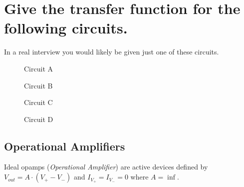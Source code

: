 \documentclass[main.tex]{subfiles}
\begin{document}
\section{Give the transfer function for the following circuits.}

\noindent In a real interview you would likely be given just one of these circuits.

\begin{figure}[h!]
    \begin{center}
        \begin{circuitikz}[american]
            \label{fig:unity_amp}
        \end{circuitikz}
        \caption{Circuit A}
    \end{center}
\end{figure}

\begin{figure}[h!]
    \begin{center}
        \begin{circuitikz}[american]
            \label{fig:inverting_amp}
        \end{circuitikz}
        \caption{Circuit B}
    \end{center}
\end{figure}

\begin{figure}[h!]
    \begin{center}
        \begin{circuitikz}[american]
            \label{fig:non_inverting_amp}
        \end{circuitikz}
        \caption{Circuit C}
    \end{center}
\end{figure}

\begin{figure}[h!]
    \begin{center}
        \begin{circuitikz}[american]
            \label{fig:difference_amp}
        \end{circuitikz}
        \caption{Circuit D}
    \end{center}
\end{figure}

\spoilerline

\subsection{Operational Amplifiers}
Ideal opamps (\textit{Operational Amplifier}) are active devices defined by $V_{out} = A \cdot (V_{+} - V_{-})$ and $I_{V_{+}} = I_{V_{-}} = 0$ where $A = \inf$. 
\end{document}
